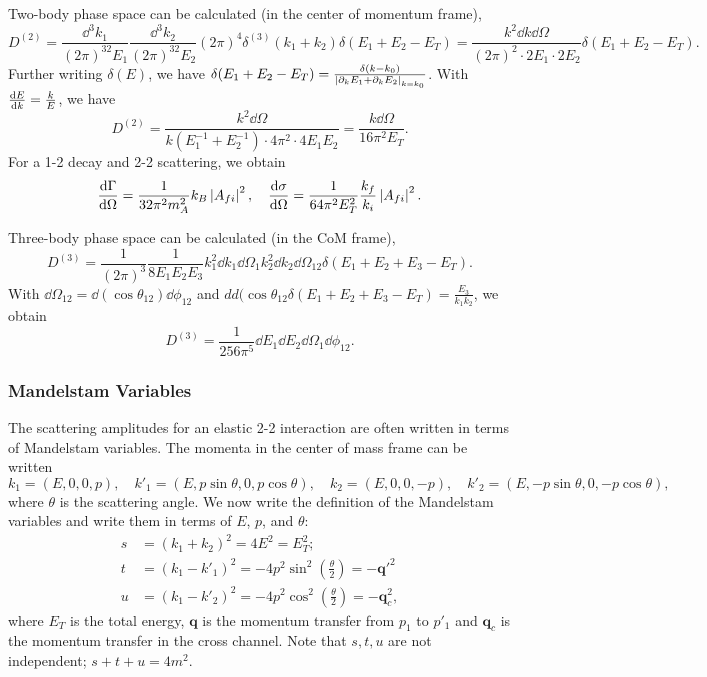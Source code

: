 \documentclass{article}
\begin{document}
\example Two-body phase space can be calculated (in the center of momentum frame),
$$D^{(2)}=\frac{\dd^3k_1}{(2\pi)^32E_1}\frac{\dd^3k_2}{(2\pi)^32E_2}(2\pi)^4\delta^{(3)}(k_1+k_2)\delta(E_1+E_2-E_T)=\frac{k^2\dd k\dd\Omega}{(2\pi)^2\cdot 2E_1\cdot 2E_2}\delta(E_1+E_2-E_T).$$
Further writing $\delta(E)$, we have $\delta(E_1+E_2-E_T)=\frac{\delta(k-k_0)}{\left\lvert\partial_kE_1+\partial_kE_2\right\rvert_{k=k_0}}$. With $\frac{\mathrm{d}E}{\mathrm{d}k}=\frac k{E}$, we have 
\begin{equation}
    D^{(2)}=\frac{k^2\dd\Omega}{k(E_1^{-1}+E_2^{-1})\cdot 4\pi^2\cdot 4E_1E_2}=\frac{k\dd\Omega}{16\pi^2E_T}.
\end{equation}
For a 1-2 decay and 2-2 scattering, we obtain
$$\frac{\mathrm{d}\Gamma}{\mathrm{d}\Omega}=\frac{1}{32\pi^2m_A^2}k_B\left\lvert A_{fi}\right\rvert^2,\quad\frac{\mathrm{d}\sigma}{\mathrm{d}\Omega}=\frac 1{64\pi^2E_T^2}\frac{k_f}{k_i}\left\lvert A_{fi}\right\rvert^2.$$

\example Three-body phase space can be calculated (in the CoM frame),
$$D^{(3)}=\frac 1{(2\pi)^3}\frac 1{8E_1E_2E_3}k^2_1\dd k_1\dd\Omega_1k^2_2\dd k_2\dd\Omega_{12}\delta(E_1+E_2+E_3-E_T).$$
With $\dd\Omega_{12}=\dd(\cos\theta_{12})\dd\phi_{12}$ and $dd(\cos\theta_{12}\delta(E_1+E_2+E_3-E_T)=\frac{E_3}{k_1k_2}$, we obtain
$$D^{(3)}=\frac 1{256\pi^5}\dd E_1\dd E_2\dd\Omega_1\dd\phi_{12}.$$

\subsubsection{Mandelstam Variables}

The scattering amplitudes for an elastic 2-2 interaction are often written in terms of Mandelstam variables. The momenta in the center of mass frame can be written
$$k_1=(E,0,0,p),\quad k'_1=(E,p\sin\theta,0,p\cos\theta),\quad k_2=(E,0,0,-p),\quad k'_2=(E,-p\sin\theta,0,-p\cos\theta),$$
where $\theta$ is the scattering angle. We now write the definition of the Mandelstam variables and write them in terms of $E$, $p$, and $\theta$:
\begin{align*}
    s&=(k_1+k_2)^2=4E^2=E_T^2;\\
    t&=(k_1-k'_1)^2=-4p^2\sin^2\left(\frac\theta 2\right)=-\mathbf q'^2\\
    u&=(k_1-k'_2)^2=-4p^2\cos^2\left(\frac\theta 2\right)=-\mathbf q_c^2,
\end{align*}
where $E_T$ is the total energy, $\mathbf q$ is the momentum transfer from $p_1$ to $p'_1$ and $\mathbf q_c$ is the momentum transfer in the cross channel. Note that $s,t,u$ are not independent; $s+t+u=4m^2$.
\end{document}
